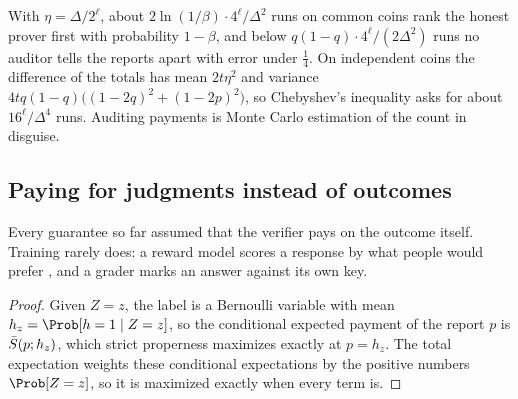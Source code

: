 \begin{refsection}
With $\eta=\Delta/2^\ell$, about $2\ln(1/\beta)\cdot4^\ell/\Delta^2$ runs on common coins rank the honest prover first with probability $1-\beta$, and below $q(1-q)\cdot4^\ell/(2\Delta^2)$ runs no auditor tells the reports apart with error under $\frac14$. On independent coins the difference of the totals has mean $2t\eta^2$ and variance $4tq(1-q)\bigl((1-2q)^2+(1-2p)^2\bigr)$, so Chebyshev's inequality asks for about $16^\ell/\Delta^4$ runs. Auditing payments is Monte Carlo estimation of the count in disguise.

\subsection{Paying for judgments instead of outcomes}\label{sec:rational:proxy}

Every guarantee so far assumed that the verifier pays on the outcome itself. Training rarely does: a reward model scores a response by what people would prefer \parencite{ChristianoEtAl2017,OuyangEtAl2022}, and a grader marks an answer against its own key.


\begin{proof}
Given $Z=z$, the label is a Bernoulli variable with mean $h_z=\Prob[h=1\mid Z=z]$, so the conditional expected payment of the report $p$ is $\bar S(p;h_z)$, which strict properness maximizes exactly at $p=h_z$. The total expectation weights these conditional expectations by the positive numbers $\Prob[Z=z]$, so it is maximized exactly when every term is.
\end{proof}


\end{refsection}
